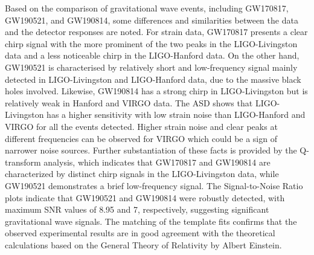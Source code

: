 
Based on the comparison of gravitational wave events, including GW170817, GW190521, and GW190814, some differences and similarities between the data and the detector responses are noted. For strain data, GW170817 presents a clear chirp signal with the more prominent of the two peaks in the LIGO-Livingston data and a less noticeable chirp in the LIGO-Hanford data. On the other hand, GW190521 is characterised by relatively short and low-frequency signal mainly detected in LIGO-Livingston and LIGO-Hanford data, due to the massive black holes involved. Likewise, GW190814 has a strong chirp in LIGO-Livingston but is relatively weak in Hanford and VIRGO data. The ASD shows that LIGO-Livingston has a higher sensitivity with low strain noise than LIGO-Hanford and VIRGO for all the events detected. Higher strain noise and clear peaks at different frequencies can be observed for VIRGO which could be a sign of narrower noise sources. Further substantiation of these facts is provided by the Q-transform analysis, which indicates that GW170817 and GW190814 are characterized by distinct chirp signals in the LIGO-Livingston data, while GW190521 demonstrates a brief low-frequency signal. The Signal-to-Noise Ratio plots indicate that GW190521 and GW190814 were robustly detected, with maximum SNR values of 8.95 and 7, respectively, suggesting significant gravitational wave signals. The matching of the template fits confirms that the observed experimental results are in good agreement with the theoretical calculations based on the General Theory of Relativity by Albert Einstein.


